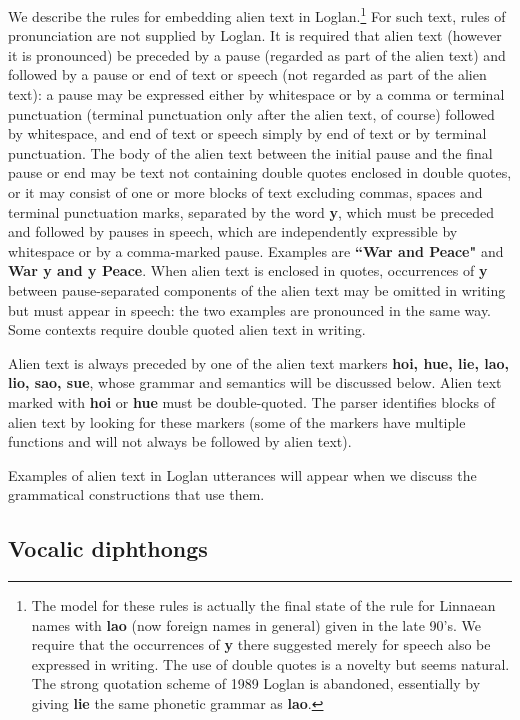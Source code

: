 \documentclass[12pt]{book}
\begin{document}
We describe the rules for embedding alien text in Loglan.\footnote{The model for these rules is actually the final state of the rule for Linnaean names with {\bf lao} (now foreign names in general) given in the late 90's.  We require that the occurrences of {\bf y} there suggested merely for speech also be expressed in writing.  The use of double quotes is a novelty but seems natural.  The strong quotation scheme of 1989 Loglan is abandoned, essentially by giving {\bf lie} the same phonetic grammar as {\bf lao}.}  For such text, rules of pronunciation are not supplied by Loglan.  It is required that alien text (however it is pronounced)
be preceded by a pause (regarded as part of the alien text) and followed by a pause or end of text or speech (not regarded as part of the alien text):  a pause may be expressed either by whitespace or by a comma or terminal punctuation (terminal punctuation only after the alien text, of course)  followed by whitespace, and end of text or speech simply by end of text or by terminal punctuation.  The body of the alien text between the initial pause and the final pause or end may be text not containing double quotes enclosed in double quotes, or it may consist of one or more blocks of text excluding commas, spaces and terminal punctuation marks, separated by the word {\bf y}, which must be preceded and followed by pauses in speech, which are independently expressible by whitespace or by a comma-marked pause.  Examples are {\bf``War and Peace"} and {\bf War y and y Peace}.   When alien text is enclosed in quotes, occurrences of {\bf y} between pause-separated components of the alien text may be omitted in writing but must appear in speech:  the two examples are pronounced in the same way.  Some contexts require double quoted alien text in writing.

Alien text is always preceded by one of the alien text markers {\bf hoi, hue, lie, lao, lio, sao, sue}, whose grammar and semantics will be discussed below.  Alien text marked with
{\bf hoi} or {\bf hue} must be double-quoted.   The parser identifies blocks of alien text by looking for these markers (some of the markers have multiple functions and will not always be followed by alien text).

Examples of alien text in Loglan utterances will appear when we discuss the grammatical constructions that use them.

\subsection{Vocalic diphthongs}
\end{document}
